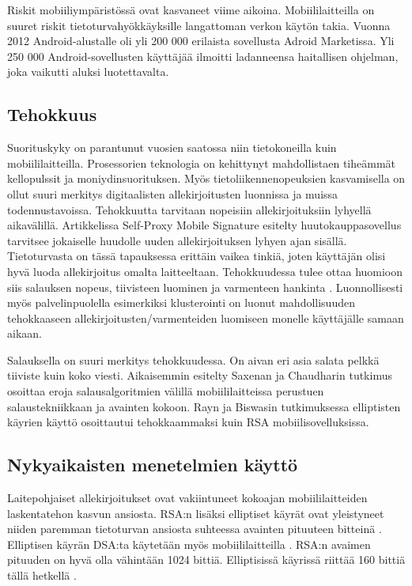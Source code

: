 \documentclass[finnish]{tktltiki2}
\theoremstyle{definition}
\theoremstyle{remark}
\begin{document}
Riskit mobiiliympäristössä ovat kasvaneet viime aikoina. Mobiililaitteilla on suuret riskit tietoturvahyökkäyksille langattoman verkon käytön takia. Vuonna 2012 Android-alustalle oli yli 200 000 erilaista sovellusta Adroid Marketissa. Yli 250 000 Android-sovellusten käyttäjää ilmoitti ladanneensa haitallisen ohjelman, joka vaikutti aluksi luotettavalta. \cite{enti}   
	  

\subsection{Tehokkuus}

Suorituskyky on parantunut vuosien saatossa niin tietokoneilla kuin mobiililaitteilla. Prosessorien teknologia on kehittynyt mahdollistaen tiheämmät kellopulssit ja moniydinsuorituksen. Myös tietoliikennenopeuksien kasvamisella on ollut suuri merkitys digitaalisten allekirjoitusten luonnissa ja muissa todennustavoissa. Tehokkuutta tarvitaan nopeisiin allekirjoituksiin lyhyellä aikavälillä. Artikkelissa Self-Proxy Mobile Signature \cite{proxy} esitelty huutokauppasovellus tarvitsee jokaiselle huudolle uuden  allekirjoituksen lyhyen ajan sisällä. Tietoturvasta on tässä tapauksessa erittäin vaikea tinkiä, joten käyttäjän olisi hyvä luoda allekirjoitus omalta laitteeltaan. Tehokkuudessa tulee ottaa huomioon siis salauksen nopeus, tiivisteen luominen ja varmenteen hankinta \cite{proxy}. Luonnollisesti myös palvelinpuolella esimerkiksi klusterointi on luonut mahdollisuuden tehokkaaseen allekirjoitusten/varmenteiden luomiseen monelle käyttäjälle samaan aikaan.

Salauksella on suuri merkitys tehokkuudessa. On aivan eri asia salata pelkkä tiiviste kuin koko viesti. Aikaisemmin esitelty Saxenan ja Chaudharin \cite{gsm} tutkimus osoittaa eroja salausalgoritmien välillä mobiililaitteissa perustuen salaustekniikkaan ja avainten kokoon. Rayn ja Biswasin \cite{ECC} tutkimuksessa elliptisten käyrien käyttö osoittautui tehokkaammaksi kuin RSA mobiilisovelluksissa.

\subsection{Nykyaikaisten menetelmien käyttö}

Laitepohjaiset allekirjoitukset ovat vakiintuneet kokoajan mobiililaitteiden laskentatehon kasvun ansiosta. RSA:n lisäksi elliptiset käyrät ovat yleistyneet niiden paremman tietoturvan ansiosta suhteessa avainten pituuteen bitteinä \cite{ECC}. Elliptisen käyrän DSA:ta käytetään myös mobiililaitteilla \cite{webs}. RSA:n avaimen pituuden on hyvä olla vähintään 1024 bittiä. Elliptisissä käyrissä riittää 160 bittiä tällä hetkellä \cite{ECC}.
\end{document}
